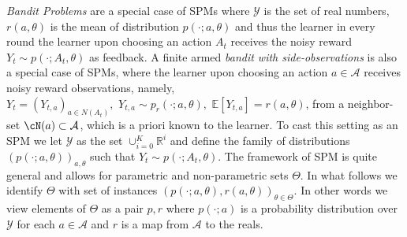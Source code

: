 \documentclass[11pt]{article} %
\newcommand{\Y}{\mathcal{Y}}
\newcommand{\A}{\mathcal{A}}
\newcommand{\EE}[1]{\mathbb{E}\left[#1\right]}
\newcommand{\R}{\mathbb{R}} %
\begin{document}
\emph{Bandit Problems} are a special case of SPMs where 
$\Y$ is the set of real numbers, $r(a,\theta)$ is the mean of distribution $p(\cdot;a,\theta)$ and thus the learner in every round the learner upon choosing an action $A_t$ receives the noisy reward $Y_t \sim p(\cdot;A_t,\theta)$ as feedback. 
A finite armed \emph{bandit with side-observations} \cite{MaSh11} is also a special case of SPMs, where the learner upon choosing an action $a \in \A$ receives noisy reward observations, namely, $Y_t  = (Y_{t,a})_{a\in N(A_t)},\,\,Y_{t,a} \sim p_r(\cdot;a,\theta),\,\,\EE{Y_{t,a}} = r(a,\theta)$, from a neighbor-set $\cN(a) \subset \A$, which is a priori known to the learner. 
%
%
%
To cast this setting as an SPM we let $\Y$ as the set $\cup_{i=0}^K \R^i$ and define 
the family of distributions $(p(\cdot;a,\theta))_{a,\theta}$ such that $Y_t \sim p(\cdot;A_t,\theta)$.
The framework of SPM is quite general and allows for parametric and non-parametric sets $\Theta$. 
In what follows we identify $\Theta$ with set of instances $(p(\cdot;a,\theta),r(a,\theta))_{\theta\in \Theta}$.
In other words we view elements of $\Theta$ as a pair $p,r$ where $p(\cdot;a)$ is a probability distribution over $\Y$ for each $a\in \A$ and $r$ is a map from $\A$ to the reals.
\end{document}
